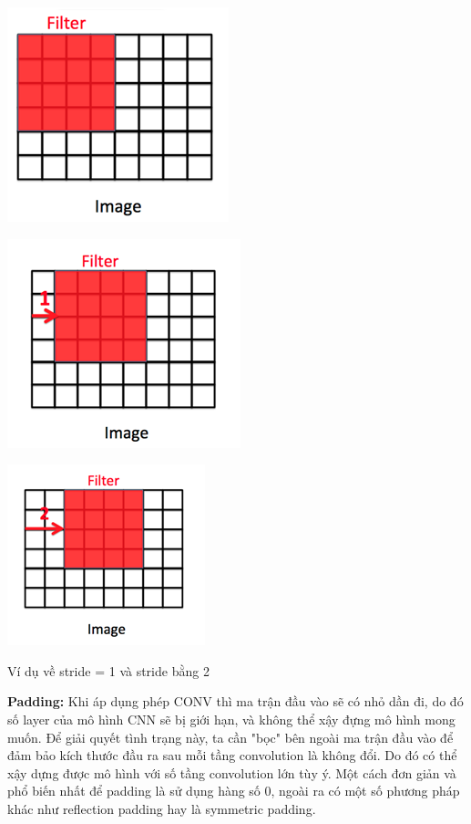 \documentclass[a4paper, 12pt]{report}
\begin{document}
\begin{center}
\begin{minipage}{4cm}
	\centering
	\includegraphics[scale=0.5]{Images/stride1}
\end{minipage}
\begin{minipage}{4cm}
	\centering
	\includegraphics[scale=0.425]{Images/stride2}
\end{minipage}
\begin{minipage}{4cm}
	\centering
	\includegraphics[scale=0.5]{Images/stride3}
\end{minipage}

Ví dụ về stride = 1 và stride bằng 2
\end{center}
\textbf{Padding:} Khi áp dụng phép CONV thì ma trận đầu vào sẽ có nhỏ dần đi, do đó số layer của mô hình CNN sẽ bị giới hạn, và không thể xậy đựng mô hình mong muốn. Để giải quyết tình trạng này, ta cần "bọc" bên ngoài ma trận đầu vào để đảm bảo kích thước đầu ra sau mỗi tầng convolution là không đổi. Do đó có thể xậy dựng được mô hình với số tầng convolution lớn tùy ý. Một cách đơn giản và phổ biến nhất để padding là sử dụng hàng số 0, ngoài ra có một số phương pháp khác như reflection padding hay là symmetric padding. \par
\end{document}

